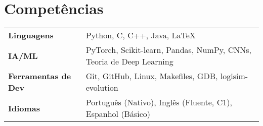 \documentclass[a4paper,12pt]{article}
\begin{document}
\section{Competências}
\begin{tabularx}{\linewidth}{@{}l X@{}}
\textbf{Linguagens} & Python, C, C++, Java, LaTeX \\
\textbf{IA/ML} & PyTorch, Scikit-learn, Pandas, NumPy, CNNs, Teoria de Deep Learning \\
\textbf{Ferramentas de Dev} & Git, GitHub, Linux, Makefiles, GDB, logisim-evolution \\
\textbf{Idiomas} & Português (Nativo), Inglês (Fluente, C1), Espanhol (Básico)\\
\end{tabularx}

\vfill
{}
\end{document}
